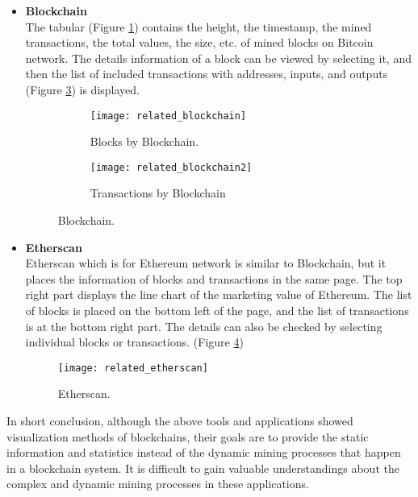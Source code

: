 \begin{itemize}
    \item \textbf{Blockchain} \cite{blockchain} \\
        The tabular (Figure \ref{fig:blocks by blockchain}) contains the height, the timestamp, the mined transactions, the total values, the size, etc. of mined blocks on Bitcoin network. The details information of a block can be viewed by selecting it, and then the list of included transactions with addresses, inputs, and outputs (Figure \ref{fig:transactions by blockchain}) is displayed.

        \begin{figure}[htb]
            \centering
            \begin{subfigure}[b]{1\textwidth}
                \centering
                \texttt{[image: related\_blockchain]}
                \caption{Blocks by Blockchain.}
                \label{fig:blocks by blockchain}
            \end{subfigure}

            \begin{subfigure}[b]{1\textwidth}
                \centering
                \texttt{[image: related\_blockchain2]}
                \caption{Transactions by Blockchain}
                \label{fig:transactions by blockchain}
            \end{subfigure}

            \caption{Blockchain.}
        \end{figure}
    \item \textbf{Etherscan} \cite{etherscan} \\
        Etherscan which is for Ethereum network is similar to Blockchain, but it places the information of blocks and transactions in the same page. The top right part displays the line chart of the marketing value of Ethereum. The list of blocks is placed on the bottom left of the page, and the list of transactions is at the bottom right part. The details can also be checked by selecting individual blocks or transactions. (Figure \ref{fig:etherscan})
        \begin{figure}[htb]
            \centering
            \texttt{[image: related\_etherscan]}
            \caption{Etherscan.}
            \label{fig:etherscan}
        \end{figure}
\end{itemize}

In short conclusion, although the above tools and applications showed visualization methods of blockchains, their goals are to provide the static information and statistics instead of the dynamic mining processes that happen in a blockchain system. It is difficult to gain valuable understandings about the complex and dynamic mining processes in these applications.

